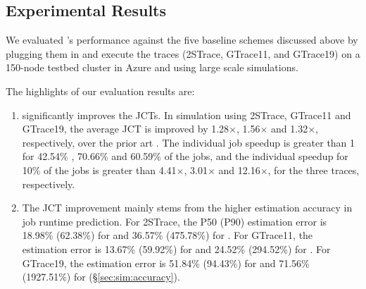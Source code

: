 \subsection{Experimental Results}
\label{sec:study:sim}

We evaluated \slearn's performance against the five baseline schemes discussed
above by plugging them in \gs and execute the \numTraces traces (2STrace, GTrace11,
and GTrace19) on a 150-node testbed cluster in Azure and using large scale
simulations.

The highlights of our evaluation results are:
\begin{enumerate} %
\item \slearn significantly improves the JCTs. In simulation using 2STrace, GTrace11
	and GTrace19, the average JCT is improved by 1.28$\times$, 1.56$\times$ and
	1.32$\times$, respectively, over the prior art \primarybase.
The individual job speedup is greater than 1
for 42.54\% , 70.66\% and 60.59\% of the jobs,
and the individual speedup for 10\% of the jobs 
is greater than 4.41$\times$, 3.01$\times$ and 12.16$\times$,
for the three traces, respectively.
\item 
The JCT improvement mainly stems from the higher estimation accuracy in job runtime
prediction. For 2STrace, the P50 (P90) estimation error is 
		18.98\% (62.38\%) for \slearn and
        36.57\% (475.78\%) for \primarybasepredict.
        For GTrace11, the estimation error is  13.67\% (59.92\%)
        for \slearn and 24.52\% (294.52\%) for \primarybasepredict.
        For GTrace19, the estimation error is  51.84\% (94.43\%)
        for \slearn and 71.56\% (1927.51\%) for \primarybasepredict (\S\ref{sec:sim:accuracy}).
\end{enumerate}

